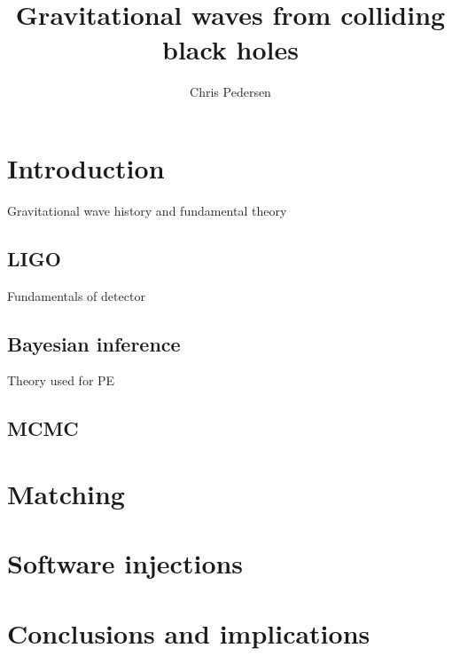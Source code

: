 \documentclass[]{article}
\title{Gravitational waves from colliding black holes}
\author{Chris Pedersen}
\begin{document}
\maketitle

\begin{abstract}

\end{abstract}

\section{Introduction}
Gravitational wave history and fundamental theory
\subsection{LIGO}
Fundamentals of detector
\subsection{Bayesian inference}
Theory used for PE
\subsection{MCMC}
\section{Matching}
\section{Software injections}
\section{Conclusions and implications}
\end{document}
